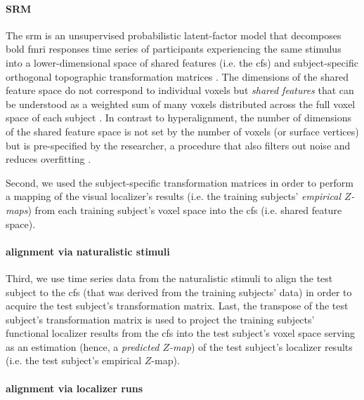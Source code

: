 \paragraph{SRM}
%
The \ac{srm} is an unsupervised probabilistic latent-factor model that
decomposes \ac{bold} \ac{fmri} responses time series of participants
experiencing the same stimulus into a lower-dimensional space of shared features
(i.e. the \ac{cfs}) and subject-specific orthogonal topographic transformation
matrices \citep{kumar2020brainiak, cohen2017computational}.
%
The dimensions of the shared feature space do not correspond to individual
voxels but \textit{shared features} that can be understood as a weighted sum of
many voxels distributed across the full voxel space of each subject
\citep{kumar2020brainiak}.
%
In contrast to hyperalignment, the number of dimensions of the shared feature
space is not set by the number of voxels (or surface vertices) but is
pre-specified by the researcher, a procedure that also filters out noise and
reduces overfitting \citep{chen2015reduced}.

Second, we used the subject-specific transformation matrices in order to perform
a mapping of the visual localizer's results (i.e. the training subjects'
\textit{empirical $Z$-maps}) from each training subject's voxel space into the
\ac{cfs} (i.e. shared feature space).


\paragraph{alignment via naturalistic stimuli}

Third, we use time series data from the naturalistic stimuli to align the test
subject to the \ac{cfs} (that was derived from the training subjects' data) in
order to acquire the test subject's transformation matrix.
Last, the transpose of the test subject's transformation matrix is used to
project the training subjects' functional localizer results from the \ac{cfs}
into the test subject's voxel space serving as an estimation (hence, a
\textit{predicted $Z$-map}) of the test subject's localizer results (i.e. the
test subject's empirical $Z$-map).


\paragraph{alignment via localizer runs}

